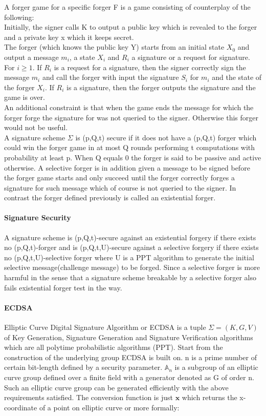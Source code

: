 \documentclass[18]{article}
\begin{document}
A forger game for a specific forger F is a game consisting of counterplay of the following:\\
Initially, the signer calls K to output a public key which is revealed to the forger and a private key x which it keeps secret.\\
The forger (which knows the public key Y) starts from an initial state $X_0$ and output a message $m_i$, a state $X_i$ and $R_i$ a signature or a request for signature.\\
For $i \ge 1$. If $R_i$ is a request for a signature, then the signer correctly sign the message $m_i$ and call the forger with input the signature $S_i$ for $m_i$ and the state of the forger $X_i$. If $R_i$ is a signature, then the forger outputs the signature and the game is over.\\
An additional constraint is that when the game ends the message for which the forger forge the signature for was not queried to the signer. Otherwise this forger would not be useful. \\
A signature scheme $\Sigma$ is (p,Q,t) secure if it does not have a (p,Q,t) forger which could win the forger game in at most Q rounds performing t computations with probability at least p. When Q equals 0 the forger is said to be passive and active otherwise. A selective forger is in addition given a message to be signed before the forger game starts and only succeed until the forger correctly forges a signature for such message which of course is not queried to the signer. In contrast the forger defined previously is called an existential forger.\\
\paragraph{Signature Security} A signature scheme is (p,Q,t)-secure against an existential forgery if there exists no (p,Q,t)-forger and is (p,Q,t,U)-secure against a selective forgery if there exists no (p,Q,t,U)-selective forger where U is a PPT algorithm to generate the initial selective message(challenge message) to be forged. Since a selective forger is more harmful in the sense that a signature scheme breakable by a selective forger also fails existential forger test in the  way.

\paragraph{ECDSA}
Elliptic Curve Digital Signature Algorithm or ECDSA is a tuple $\Sigma=(K,G,V)$ of Key Generation, Signature Generation and Signature Verification algorithms which are all polytime probabilistic algorithms (PPT).
Start from the construction of the underlying group ECDSA is built on.
n is a prime number of certain bit-length defined by a security parameter.
$\mathbb{A}_n$ is a subgroup of an elliptic curve group defined over a finite field with a generator denoted as G of order n.
Such an elliptic curve group can be generated efficiently with the above requirements satisfied.
The conversion function is just $\mathbf{x}$ which returns the x-coordinate of a point on elliptic curve or more formally:
\end{document}
